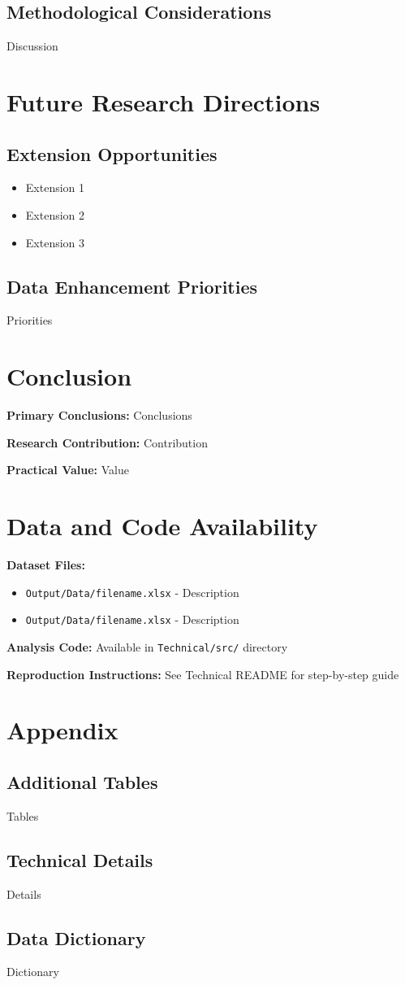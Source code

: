 \documentclass[11pt,letterpaper]{article}
\begin{document}
\subsection{Methodological Considerations}
Discussion

\section{Future Research Directions}

\subsection{Extension Opportunities}
\begin{itemize}
    \item Extension 1
    \item Extension 2
    \item Extension 3
\end{itemize}

\subsection{Data Enhancement Priorities}
Priorities

\section{Conclusion}

\textbf{Primary Conclusions:} Conclusions

\textbf{Research Contribution:} Contribution

\textbf{Practical Value:} Value

\section{Data and Code Availability}

\textbf{Dataset Files:}
\begin{itemize}
    \item \texttt{Output/Data/filename.xlsx} - Description
    \item \texttt{Output/Data/filename.xlsx} - Description
\end{itemize}

\textbf{Analysis Code:} Available in \texttt{Technical/src/} directory

\textbf{Reproduction Instructions:} See Technical README for step-by-step guide

\section{Appendix}

\subsection{Additional Tables}
Tables

\subsection{Technical Details}
Details

\subsection{Data Dictionary}
Dictionary
\end{document}
